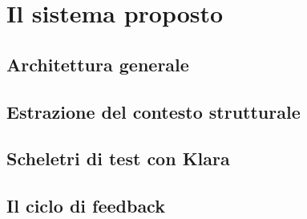 \chapter{Il sistema proposto}
\label{ch:core}


\section{Architettura generale}

\section{Estrazione del contesto strutturale}

\section{Scheletri di test con Klara}

\section{Il ciclo di feedback}

